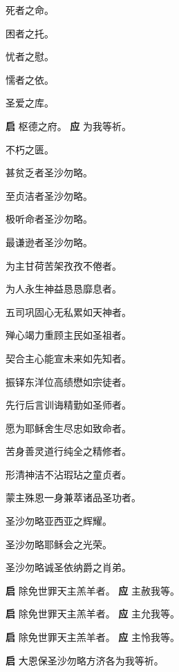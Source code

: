 \documentclass[UTF8,17pt]{ctexart}
\begin{document}
 死者之命。

 困者之托。

 忧者之慰。

 懦者之依。

 圣爱之库。

\textbf{启} \quad 枢德之府。 \hfill \textbf{应} \quad 为我等祈。

 不朽之匮。

 甚贫乏者圣沙勿略。

 ⾄贞洁者圣沙勿略。

 极听命者圣沙勿略。

 最谦逊者圣沙勿略。

 为主⽢荷苦架孜孜不倦者。

 为⼈永⽣神益恳恳靡息者。

 五司巩固⼼⽆私累如天神者。

 殚⼼竭⼒重顾主民如圣祖者。

 契合主⼼能宣未来如先知者。

 振铎东洋位⾼绩懋如宗徒者。

 先⾏后⾔训诲精勤如圣师者。

 愿为耶稣舍⽣尽忠如致命者。

 苦⾝善灵道⾏纯全之精修者。

 形清神洁不沾瑕玷之童贞者。

 蒙主殊恩⼀⾝兼萃诸品圣功者。

 圣沙勿略亚西亚之辉耀。

 圣沙勿略耶稣会之光荣。

 圣沙勿略诚圣依纳爵之肖弟。

\textbf{启} \quad 除免世罪天主羔⽺者。 \hfill \textbf{应} \quad 主赦我等。

\textbf{启} \quad 除免世罪天主羔⽺者。 \hfill \textbf{应} \quad 主允我等。

\textbf{启} \quad 除免世罪天主羔⽺者。 \hfill \textbf{应} \quad 主怜我等。

\textbf{启} \quad ⼤恩保圣沙勿略⽅济各为我等祈。
\end{document}
